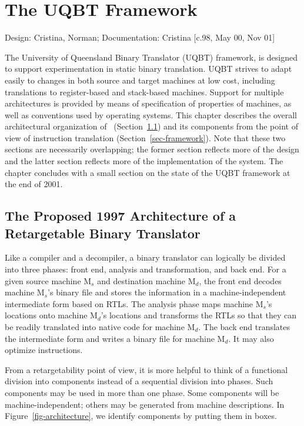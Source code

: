 
\chapter{The UQBT Framework}
\label{ch-uqbt-framework}

{\small
\begin{flushright}
Design: Cristina, Norman; Documentation: Cristina [c.98, May 00, Nov 01]
\end{flushright} 
}

The University of Queensland Binary Translator (UQBT) 
framework, is designed to support experimentation in static
binary translation.
UQBT strives to adapt easily to changes in both source and
target machines at low cost, including translations to
register-based and stack-based machines.
Support for multiple architectures is provided by means
of specification of properties of machines, as well as 
conventions used by operating systems.  
This chapter describes the overall architectural organization
of \uqbt\ (Section~\ref{sec-arch}) and its components from the point of view 
of instruction translation (Section~\ref{sec-framework}).  Note that
these two sections are necessarily overlapping; the former
section reflects more of the design and the latter section
reflects more of the implementation of the system.  
The chapter concludes with a small section on the state of the
UQBT framework at the end of 2001. 


\section{The Proposed 1997 Architecture of a Retargetable Binary Translator}
\label{sec-arch}

Like a compiler and a decompiler, a binary translator can logically
be divided into three phases: front end, analysis and transformation,
and back end.  For a given source machine M$_s$ and destination machine M$_d$,
the front end decodes machine M$_s$'s binary file and stores the 
information in a machine-independent intermediate form based on RTLs.
The analysis phase maps machine M$_s$'s locations onto machine M$_d$'s 
locations and transforms the RTLs so that they can be readily translated into 
native code for machine M$_d$.  The back end translates the intermediate 
form and writes a binary file for machine M$_d$.  It may also optimize 
instructions.

From a retargetability point of view, it is more helpful to think of 
a functional division into components instead of a sequential division 
into phases.  Such components may be used in more than one phase.
Some components will be machine-independent; others may be generated 
from machine descriptions.  In Figure~\ref{fig-architecture}, we identify 
components by putting them in boxes.

